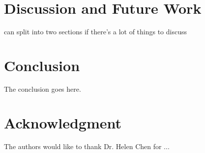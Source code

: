 \documentclass[conference]{IEEEtran}
\begin{document}
\section{Discussion and Future Work}
\label{discFuture}

can split into two sections if there's a lot of things to discuss


\section{Conclusion}
\label{concl}
The conclusion goes here.






\section*{Acknowledgment}


The authors would like to thank Dr. Helen Chen for ...











\end{document}
